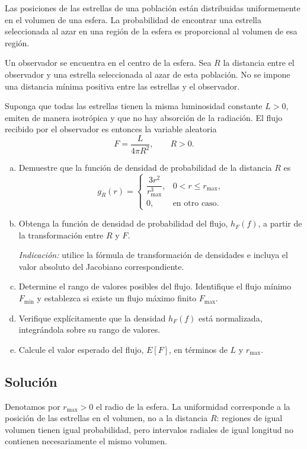 \documentclass[a4paper]{article}
\begin{document}
Las posiciones de las estrellas de una población están distribuidas uniformemente en el volumen de una esfera. La probabilidad de encontrar una estrella seleccionada al azar en una región de la esfera es proporcional al volumen de esa región.

Un observador se encuentra en el centro de la esfera. Sea $R$ la distancia entre el observador y una estrella seleccionada al azar de esta población. No se impone una distancia mínima positiva entre las estrellas y el observador.

Suponga que todas las estrellas tienen la misma luminosidad constante $L>0$, emiten de manera isotrópica y que no hay absorción de la radiación. El flujo recibido por el observador es entonces la variable aleatoria
$$
F=\frac{L}{4\pi R^2},\qquad R>0.
$$



\begin{enumerate}[a)]
    \item Demuestre que la función de densidad de probabilidad de la distancia $R$ es
    $$
    g_R(r)=
    \begin{cases}
        \dfrac{3r^2}{r_{\max}^3}, & 0<r\le r_{\max},\\[2mm]
        0, & \text{en otro caso}.
    \end{cases}
    $$
    \item Obtenga la función de densidad de probabilidad del flujo, $h_F(f)$, a partir de la transformación entre $R$ y $F$.

    \textit{Indicación:} utilice la fórmula de transformación de densidades e incluya el valor absoluto del Jacobiano correspondiente.
    \item Determine el rango de valores posibles del flujo. Identifique el flujo mínimo $F_{\min}$ y establezca si existe un flujo máximo finito $F_{\max}$.
    \item Verifique explícitamente que la densidad $h_F(f)$ está normalizada, integrándola sobre su rango de valores.
    \item Calcule el valor esperado del flujo, $E[F]$, en términos de $L$ y $r_{\max}$.
\end{enumerate}

\subsection{Solución}

Denotamos por $r_{\max}>0$ el radio de la esfera. La uniformidad corresponde a la posición de las estrellas en el volumen, no a la distancia $R$: regiones de igual volumen tienen igual probabilidad, pero intervalos radiales de igual longitud no contienen necesariamente el mismo volumen.
\end{document}
